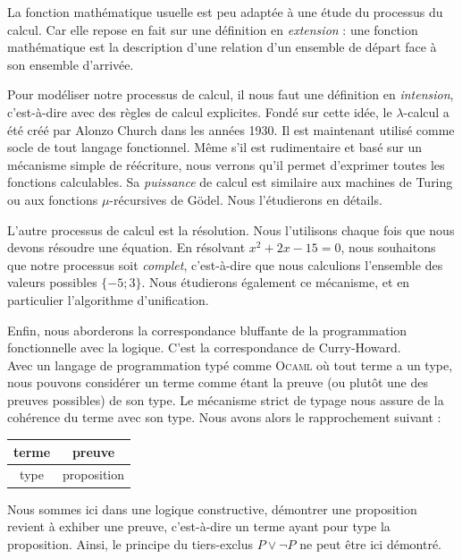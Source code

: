 \documentclass[11pt]{book}
\begin{document}
\vspace{0.3cm}
La fonction mathématique usuelle est peu adaptée à une étude du processus du calcul. Car elle
repose en fait sur une définition en \textit{extension} : une fonction mathématique est la 
description d'une relation d'un ensemble de départ face à son ensemble d'arrivée.

Pour modéliser notre processus de calcul, il nous faut une définition en \textit{intension}, 
c'est-à-dire avec des règles de calcul explicites. Fondé sur
cette idée, le $\lambda$-calcul a été créé par Alonzo Church dans les années 1930.
Il est maintenant utilisé comme socle de tout langage fonctionnel. 
Même s'il est  rudimentaire et basé sur un mécanisme simple de réécriture,
nous verrons qu'il permet d'exprimer toutes les fonctions calculables. Sa \textit{puissance}
de calcul est similaire aux machines de Turing ou aux fonctions $\mu$-récursives de Gödel.
Nous l'étudierons en détails.

\vspace{0.3cm}
L'autre processus de calcul est la résolution. Nous l'utilisons chaque fois que nous devons résoudre
une équation. En résolvant $x^2+2x-15=0$, nous souhaitons que notre processus 
soit \textit{complet}, c'est-à-dire que nous calculions 
l'ensemble des valeurs possibles $\{-5; 3\}$.
Nous étudierons également  ce mécanisme, et en particulier l'algorithme d'unification.

\vspace{0.3cm}
Enfin, nous aborderons la correspondance bluffante de la programmation fonctionnelle avec la logique. 
C'est la correspondance de Curry-Howard. \\
Avec un langage de programmation typé comme \textsc{Ocaml} où tout terme a un type, nous pouvons
considérer un terme comme étant  la preuve (ou plutôt une des preuves possibles) de son type. 
Le mécanisme strict de typage nous assure de la cohérence du terme avec son type.
Nous avons alors le rapprochement suivant : 

\begin{center}
\begin{tabular}[]{|c|c|}
  \hline
  terme & preuve \\
  \hline
  type & proposition \\
  \hline
\end{tabular}
\end{center}

Nous sommes ici dans une logique constructive, démontrer une proposition revient à exhiber une preuve, c'est-à-dire 
un terme ayant pour type la proposition.
Ainsi, le principe du tiers-exclus $P \vee  \neg P$ ne peut être ici démontré.
\end{document}

